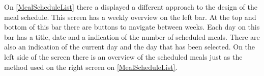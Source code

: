 On \cref{MealScheduleList} there a displayed a different approach to the design of the meal schedule. This screen has a weekly overview on the left bar. At the top and bottom of this bar there are buttons to navigate between weeks. Each day on this bar has a title, date and a indication of the number of scheduled meals. There are also an indication of the current day and the day that has been selected. On  the left side of the screen there is an overview of the scheduled meals just as the method used on the right screen on \cref{MealScheduleList}. 

